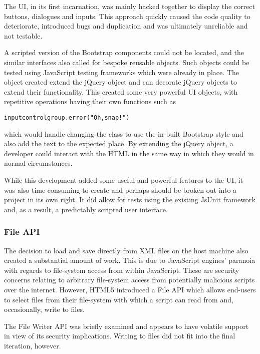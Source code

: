 The UI, in its first incarnation, was mainly hacked together to display the correct buttons, dialogues and inputs. This approach quickly caused the code quality to deteriorate, introduced bugs and duplication and was ultimately unreliable and not testable.

A scripted version of the Bootstrap components could not be located, and the similar interfaces also called for bespoke reusable objects. Such objects could be tested using Java\-Script testing frameworks which were already in place. The object created extend the jQuery object and can decorate jQuery objects to extend their functionality. This created some very powerful UI objects, with repetitive operations having their own functions such as
\begin{alltt}inputcontrolgroup.error("Oh, snap!")\end{alltt}
which would handle changing the class to use the in-built Bootstrap style and also add the text to the expected place. By extending the jQuery object, a developer could interact with the HTML in the same way in which they would in normal circumstances.

While this development added some useful and powerful features to the UI, it was also time-consuming to create and perhaps should be broken out into a project in its own right. It did allow for tests using the existing JsUnit framework and, as a result, a predictably scripted user interface.

\subsubsection{File API}
The decision to load and save directly from XML files on the host machine also created a substantial amount of work. This is due to Java\-Script engines' paranoia with regards to file-system access from within Java\-Script. These are security concerns relating to arbitrary file-system access from potentially malicious scripts over the internet. However, HTML5 introduced a File API which allows end-users to select files from their file-system with which a script can read from and, occasionally, write to files.

The File Writer API was briefly examined and appears to have volatile support in view of its security implications. Writing to files did not fit into the final iteration, however.